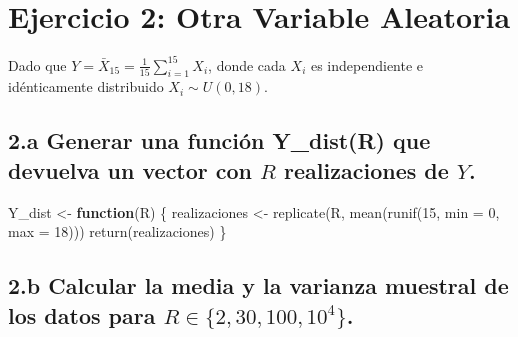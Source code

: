 \documentclass[
]{article}
\newenvironment{Shaded}{}{}
\newcommand{\AttributeTok}[1]{\textcolor[rgb]{0.49,0.56,0.16}{#1}}
\newcommand{\ControlFlowTok}[1]{\textcolor[rgb]{0.00,0.44,0.13}{\textbf{#1}}}
\newcommand{\DecValTok}[1]{\textcolor[rgb]{0.25,0.63,0.44}{#1}}
\newcommand{\FunctionTok}[1]{\textcolor[rgb]{0.02,0.16,0.49}{#1}}
\newcommand{\NormalTok}[1]{#1}
\newcommand{\OtherTok}[1]{\textcolor[rgb]{0.00,0.44,0.13}{#1}}
\begin{document}
\section{Ejercicio 2: Otra Variable
Aleatoria}\label{ejercicio-2-otra-variable-aleatoria}

Dado que \(Y = \bar{X}_{15} = \frac{1}{15} \sum_{i=1}^{15} X_i\), donde
cada \(X_i\) es independiente e idénticamente distribuido
\(X_i \sim U(0, 18)\).

\subsection{\texorpdfstring{2.a Generar una función Y\_dist(R) que
devuelva un vector con \(R\) realizaciones de
\(Y\).}{2.a Generar una función Y\_dist(R) que devuelva un vector con R realizaciones de Y.}}\label{a-generar-una-funciuxf3n-y_distr-que-devuelva-un-vector-con-r-realizaciones-de-y.}

\begin{Shaded}
\begin{Highlighting}[]
\NormalTok{Y\_dist }\OtherTok{\textless{}{-}} \ControlFlowTok{function}\NormalTok{(R) \{}
\NormalTok{  realizaciones }\OtherTok{\textless{}{-}} \FunctionTok{replicate}\NormalTok{(R, }\FunctionTok{mean}\NormalTok{(}\FunctionTok{runif}\NormalTok{(}\DecValTok{15}\NormalTok{, }\AttributeTok{min =} \DecValTok{0}\NormalTok{, }\AttributeTok{max =} \DecValTok{18}\NormalTok{)))}
  \FunctionTok{return}\NormalTok{(realizaciones)}
\NormalTok{\}}
\end{Highlighting}
\end{Shaded}

\subsection{\texorpdfstring{2.b Calcular la media y la varianza muestral
de los datos para
\(R \in \{2, 30, 100, 10^4\}\).}{2.b Calcular la media y la varianza muestral de los datos para R \textbackslash in \textbackslash\{2, 30, 100, 10\^{}4\textbackslash\}.}}\label{b-calcular-la-media-y-la-varianza-muestral-de-los-datos-para-r-in-2-30-100-104.-1}
\end{document}
